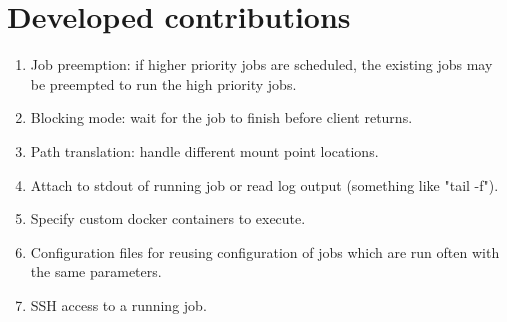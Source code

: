 \section{Developed contributions}
\begin{enumerate}
  \item Job preemption: if higher priority jobs are scheduled, the existing jobs may be preempted to run the high priority jobs.
  \item Blocking mode: wait for the job to finish before client returns.
  \item Path translation: handle different mount point locations.
  \item Attach to stdout of running job or read log output (something like "tail -f").
  \item Specify custom docker containers to execute.
  \item Configuration files for reusing configuration of jobs which are run often with the same parameters.
  \item SSH access to a running job.
\end{enumerate}

